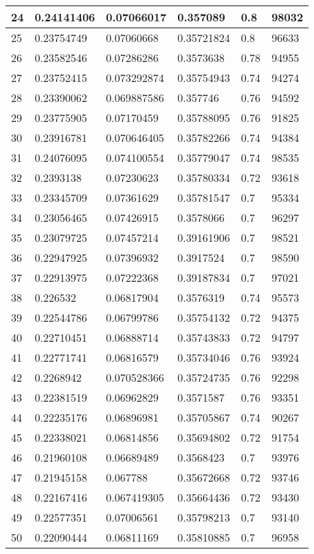 \begin{longtable}{|l|l|l|l|l|l|}
24 & 0.24141406 & 0.07066017 & 0.357089 & 0.8 & 98032 \\ \hline 
25 & 0.23754749 & 0.07060668 & 0.35721824 & 0.8 & 96633 \\ \hline 
26 & 0.23582546 & 0.07286286 & 0.3573638 & 0.78 & 94955 \\ \hline 
27 & 0.23752415 & 0.073292874 & 0.35754943 & 0.74 & 94274 \\ \hline 
28 & 0.23390062 & 0.069887586 & 0.357746 & 0.76 & 94592 \\ \hline 
29 & 0.23775905 & 0.07170459 & 0.35788095 & 0.76 & 91825 \\ \hline 
30 & 0.23916781 & 0.070646405 & 0.35782266 & 0.74 & 94384 \\ \hline 
31 & 0.24076095 & 0.074100554 & 0.35779047 & 0.74 & 98535 \\ \hline 
32 & 0.2393138 & 0.07230623 & 0.35780334 & 0.72 & 93618 \\ \hline 
33 & 0.23345709 & 0.07361629 & 0.35781547 & 0.7 & 95334 \\ \hline 
34 & 0.23056465 & 0.07426915 & 0.3578066 & 0.7 & 96297 \\ \hline 
35 & 0.23079725 & 0.07457214 & 0.39161906 & 0.7 & 98521 \\ \hline 
36 & 0.22947925 & 0.07396932 & 0.3917524 & 0.7 & 98590 \\ \hline 
37 & 0.22913975 & 0.07222368 & 0.39187834 & 0.7 & 97021 \\ \hline 
38 & 0.226532 & 0.06817904 & 0.3576319 & 0.74 & 95573 \\ \hline 
39 & 0.22544786 & 0.06799786 & 0.35754132 & 0.72 & 94375 \\ \hline 
40 & 0.22710451 & 0.06888714 & 0.35743833 & 0.72 & 94797 \\ \hline 
41 & 0.22771741 & 0.06816579 & 0.35734046 & 0.76 & 93924 \\ \hline 
42 & 0.2268942 & 0.070528366 & 0.35724735 & 0.76 & 92298 \\ \hline 
43 & 0.22381519 & 0.06962829 & 0.3571587 & 0.76 & 93351 \\ \hline 
44 & 0.22235176 & 0.06896981 & 0.35705867 & 0.74 & 90267 \\ \hline 
45 & 0.22338021 & 0.06814856 & 0.35694802 & 0.72 & 91754 \\ \hline 
46 & 0.21960108 & 0.06689489 & 0.3568423 & 0.7 & 93976 \\ \hline 
47 & 0.21945158 & 0.067788 & 0.35672668 & 0.72 & 93746 \\ \hline 
48 & 0.22167416 & 0.067419305 & 0.35664436 & 0.72 & 93430 \\ \hline 
49 & 0.22577351 & 0.07006561 & 0.35798213 & 0.7 & 93140 \\ \hline 
50 & 0.22090444 & 0.06811169 & 0.35810885 & 0.7 & 96958 \\ \hline 
\end{longtable}
